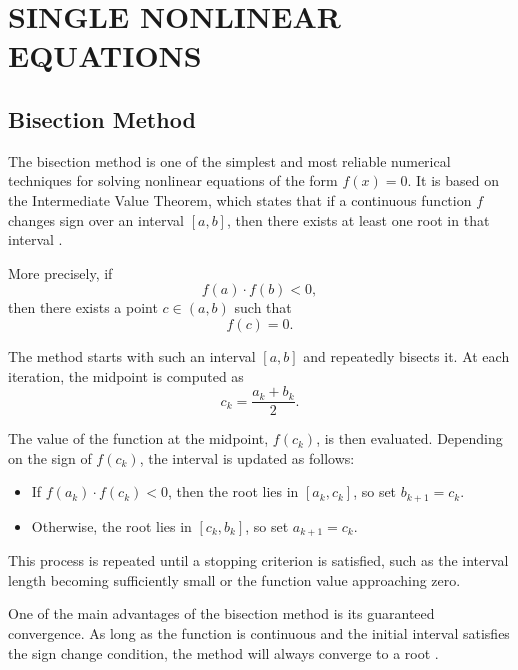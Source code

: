 \chapter{\MakeUppercase{Single Nonlinear Equations}}

\section{Bisection Method}

The bisection method is one of the simplest and most reliable numerical techniques for solving nonlinear equations of the form \( f(x) = 0 \). It is based on the Intermediate Value Theorem, which states that if a continuous function \( f \) changes sign over an interval \([a, b]\), then there exists at least one root in that interval \cite{burden, atkinson}.

More precisely, if
\begin{equation}
f(a) \cdot f(b) < 0,
\end{equation}
then there exists a point \( c \in (a, b) \) such that
\begin{equation}
f(c) = 0.
\end{equation}

The method starts with such an interval \([a, b]\) and repeatedly bisects it. At each iteration, the midpoint is computed as
\begin{equation}
c_k = \frac{a_k + b_k}{2}.
\end{equation}

The value of the function at the midpoint, \( f(c_k) \), is then evaluated. Depending on the sign of \( f(c_k) \), the interval is updated as follows:

\begin{itemize}
    \item If \( f(a_k) \cdot f(c_k) < 0 \), then the root lies in \([a_k, c_k]\), so set \( b_{k+1} = c_k \).
    \item Otherwise, the root lies in \([c_k, b_k]\), so set \( a_{k+1} = c_k \).
\end{itemize}

This process is repeated until a stopping criterion is satisfied, such as the interval length becoming sufficiently small or the function value approaching zero.

One of the main advantages of the bisection method is its guaranteed convergence. As long as the function is continuous and the initial interval satisfies the sign change condition, the method will always converge to a root \cite{burden}.

